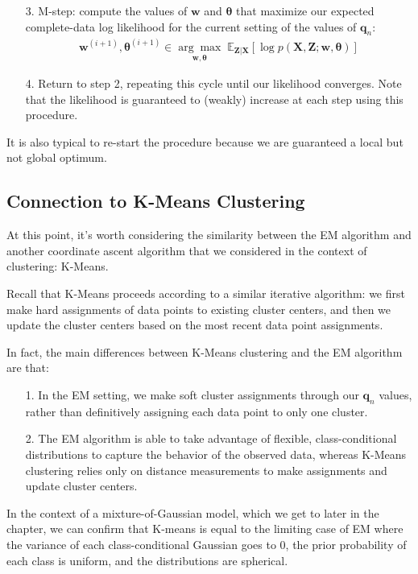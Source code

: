 \begin{itemize}
  \item[3.] M-step: compute the values of $\textbf{w}$ and $\boldsymbol{\theta}$ that maximize our expected complete-data log likelihood for the current setting of the values of $\textbf{q}_n$:
    \begin{align}
        \textbf{w}^{(i + 1)}, \boldsymbol{\theta}^{(i + 1)} \in \underset{\textbf{w}, \boldsymbol{\theta}}{\arg\max} \; \mathbb{E}_{\textbf{Z}|\textbf{X}}[\log p(\textbf{X}, \textbf{Z}; \textbf{w}, \boldsymbol{\theta})]
    \end{align}
    \item[4.] Return to step 2, repeating this cycle until our likelihood converges. Note that the likelihood is guaranteed to (weakly) increase at each step using this procedure.
    \end{itemize}

It is also typical to re-start the procedure because we are guaranteed a local but not global optimum.

\subsection{Connection to K-Means Clustering}

At this point, it's worth considering the similarity between the EM algorithm and another coordinate ascent algorithm that we considered in the context of clustering: K-Means.

Recall that K-Means proceeds according to a similar iterative algorithm: we first make hard assignments of data points to existing cluster centers, and then we update the cluster centers based on the most recent data point assignments.

In fact, the main differences between K-Means clustering and the EM algorithm are that:
\begin{itemize}
    \item[1.] In the EM setting, we make soft cluster assignments through our $\textbf{q}_n$ values, rather than definitively assigning each data point to only one cluster.
    \item[2.] The EM algorithm is able to take advantage of flexible, class-conditional distributions 
      to capture the behavior of the observed data, whereas K-Means clustering relies only on distance measurements to make assignments and update cluster centers.
    \end{itemize}

    In the context of a mixture-of-Gaussian model, which we get to later in the chapter, we can confirm that K-means is equal to the limiting case of EM where the variance of each class-conditional Gaussian goes to 0, the prior probability of each class is uniform, and the distributions are spherical.

